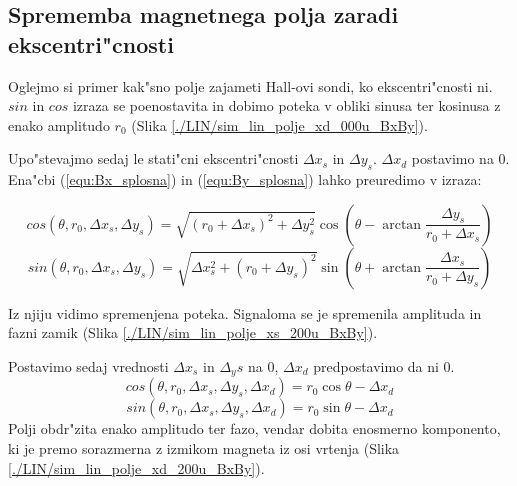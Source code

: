\subsection{Sprememba magnetnega polja zaradi ekscentri"cnosti}

Oglejmo si primer kak"sno polje zajameti Hall-ovi sondi, ko ekscentri"cnosti ni. $sin$ in $cos$ izraza se poenostavita in dobimo poteka v obliki sinusa ter kosinusa z enako amplitudo $r_0$ (Slika \ref{./LIN/sim_lin_polje_xd_000u_BxBy}).


Upo"stevajmo sedaj le stati"cni ekscentri"cnosti $\Delta x_s$ in $\Delta y_s$. $\Delta x_d$ postavimo na 0.   Ena"cbi (\ref{equ:Bx_splosna}) in (\ref{equ:By_splosna}) lahko preuredimo v izraza:


\begin{equation}
\label{equ:Bx_stat}
cos(\theta,r_0,\Delta x_s, \Delta y_s)= \sqrt{(r_0+\Delta x_s)^2+\Delta y_s^2}\cos(\theta -\arctan \frac{\Delta y_s}{r_0+\Delta x_s})
\end{equation}
\begin{equation}\label{equ:By_stat}
sin(\theta,r_0,\Delta x_s, \Delta y_s)= \sqrt{\Delta x_s^2+(r_0+\Delta y_s)^2} \sin(\theta +\arctan \frac{\Delta x_s}{r_0+\Delta y_s})
\end{equation}

Iz njiju vidimo spremenjena poteka. Signaloma se je spremenila amplituda in fazni zamik (Slika \ref{./LIN/sim_lin_polje_xs_200u_BxBy}).


Postavimo sedaj vrednosti $\Delta x_s$ in $\Delta_ys$ na 0, $\Delta x_d$ predpostavimo da ni 0.
\begin{equation}
\label{equ:Bx_din}
cos(\theta,r_0,\Delta x_s, \Delta y_s, \Delta x_d)= r_0 \cos\theta-\Delta x_d
\end{equation}
\begin{equation}
\label{equ:By_din}
sin(\theta,r_0,\Delta x_s, \Delta y_s, \Delta x_d)= r_0 \sin\theta-\Delta x_d
\end{equation}
Polji obdr"zita enako amplitudo ter fazo, vendar dobita enosmerno komponento, ki je premo sorazmerna z izmikom magneta iz osi vrtenja (Slika \ref{./LIN/sim_lin_polje_xd_200u_BxBy}).





